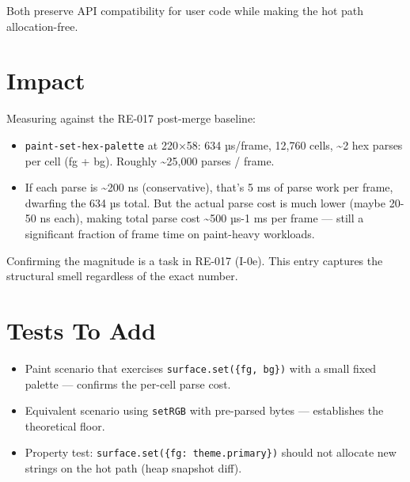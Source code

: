 Both preserve API compatibility for user code while making the hot path allocation-free.

\section{Impact}\label{record-367-impact}

Measuring against the RE-017 post-merge baseline:

\begin{itemize}
\tightlist
\item
  \texttt{p\allowbreak{}a\allowbreak{}i\allowbreak{}n\allowbreak{}t\allowbreak{}-\allowbreak{}s\allowbreak{}e\allowbreak{}t\allowbreak{}-\allowbreak{}h\allowbreak{}e\allowbreak{}x\allowbreak{}-\allowbreak{}p\allowbreak{}a\allowbreak{}l\allowbreak{}e\allowbreak{}t\allowbreak{}t\allowbreak{}e} at 220×58: 634 µs/frame, 12,760 cells, \textasciitilde2 hex parses per cell (fg + bg). Roughly \textasciitilde25,000 parses / frame.
\item
  If each parse is \textasciitilde200 ns (conservative), that's 5 ms of parse work per frame, dwarfing the 634 µs total. But the actual parse cost is much lower (maybe 20-50 ns each), making total parse cost \textasciitilde500 µs-1 ms per frame --- still a significant fraction of frame time on paint-heavy workloads.
\end{itemize}

Confirming the magnitude is a task in RE-017 (I-0e). This entry captures the structural smell regardless of the exact number.

\section{Tests To Add}\label{record-367-tests-to-add}

\begin{itemize}
\tightlist
\item
  Paint scenario that exercises \texttt{s\allowbreak{}u\allowbreak{}r\allowbreak{}f\allowbreak{}a\allowbreak{}c\allowbreak{}e\allowbreak{}.\allowbreak{}s\allowbreak{}e\allowbreak{}t\allowbreak{}(\allowbreak{}\{\allowbreak{}f\allowbreak{}g\allowbreak{},\allowbreak{} \allowbreak{}b\allowbreak{}g\allowbreak{}\}\allowbreak{})} with a small fixed palette --- confirms the per-cell parse cost.
\item
  Equivalent scenario using \texttt{s\allowbreak{}e\allowbreak{}t\allowbreak{}R\allowbreak{}G\allowbreak{}B} with pre-parsed bytes --- establishes the theoretical floor.
\item
  Property test: \texttt{s\allowbreak{}u\allowbreak{}r\allowbreak{}f\allowbreak{}a\allowbreak{}c\allowbreak{}e\allowbreak{}.\allowbreak{}s\allowbreak{}e\allowbreak{}t\allowbreak{}(\allowbreak{}\{\allowbreak{}f\allowbreak{}g\allowbreak{}:\allowbreak{} \allowbreak{}t\allowbreak{}h\allowbreak{}e\allowbreak{}m\allowbreak{}e\allowbreak{}.\allowbreak{}p\allowbreak{}r\allowbreak{}i\allowbreak{}m\allowbreak{}a\allowbreak{}r\allowbreak{}y\allowbreak{}\}\allowbreak{})} should not allocate new strings on the hot path (heap snapshot diff).
\end{itemize}

